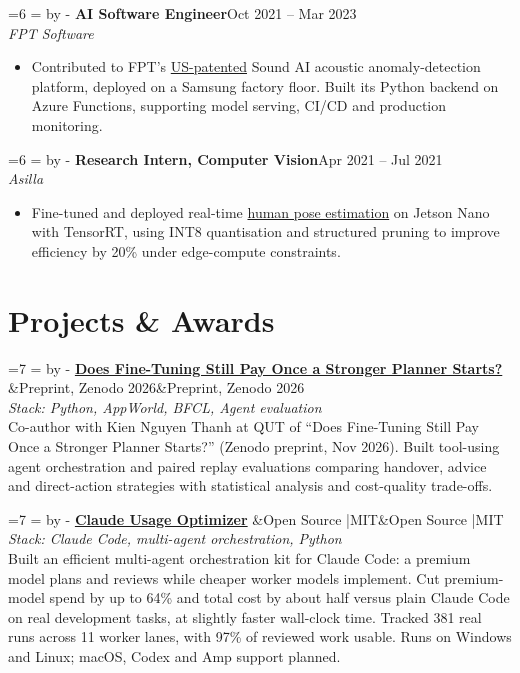 \documentclass[11pt, a4paper]{article}
\newcommand{\needroom}[1]{%
  \par\begingroup
  \dimen0=#1\relax
  \dimen2=\pagegoal\relax\advance\dimen2 by -\pagetotal\relax
  \ifdim\dimen0>\dimen2\relax\newpage\fi
  \endgroup
}
\newcommand{\role}[4]{%
  \needroom{6\baselineskip}%
  \noindent\textbf{#1}\hfill\textcolor{muted}{#2}\\
  \textit{#3}\hfill\textcolor{muted}{#4}\vspace{3pt}%
}
\newcommand{\project}[3]{%
  \needroom{7\baselineskip}%
  \noindent\textbf{#1}%
  \ifx&#2&\else\hfill\textcolor{muted}{\small #2}\fi\\[-2pt]
  \textcolor{muted}{\small\textit{Stack: #3}}\vspace{3pt}%
}
\begin{document}
\vspace{4pt}

\role{AI Software Engineer}{Oct 2021 -- Mar 2023}
{FPT Software}{}
\begin{itemize}
\item Contributed to FPT's \href{https://fptsoftware.com/newsroom/news-and-press-releases/news/fpt-achieves-us-patent-for-advanced-acoustic-anomaly-detection-technology}{US-patented} Sound AI acoustic anomaly-detection platform, deployed on a Samsung factory floor. Built its Python backend on Azure Functions, supporting model serving, CI/CD and production monitoring.
\end{itemize}

\vspace{4pt}

\role{Research Intern, Computer Vision}{Apr 2021 -- Jul 2021}
{Asilla}{}
\begin{itemize}
\item Fine-tuned and deployed real-time \href{https://github.com/hieunguyen7337/trt_pose_edited}{human pose estimation} on Jetson Nano with TensorRT, using INT8 quantisation and structured pruning to improve efficiency by 20\% under edge-compute constraints.
\end{itemize}

\section{Projects \& Awards}

\project{\href{https://doi.org/10.5281/zenodo.23882361}{Does Fine-Tuning Still Pay Once a Stronger Planner Starts?}}{Preprint, Zenodo 2026}
{Python, AppWorld, BFCL, Agent evaluation}\\
Co-author with Kien Nguyen Thanh at QUT of ``Does Fine-Tuning Still Pay Once a Stronger Planner Starts?'' (Zenodo preprint, Nov 2026). Built tool-using agent orchestration and paired replay evaluations comparing handover, advice and direct-action strategies with statistical analysis and cost-quality trade-offs.
\vspace{4pt}

\project{\href{https://github.com/hieunguyen7337/claude-usage-optimizer-releases}{Claude Usage Optimizer}}{Open Source \enspace|\enspace MIT}
{Claude Code, multi-agent orchestration, Python}\\
Built an efficient multi-agent orchestration kit for Claude Code: a premium model plans and reviews while cheaper worker models implement. Cut premium-model spend by up to 64\% and total cost by about half versus plain Claude Code on real development tasks, at slightly faster wall-clock time. Tracked 381 real runs across 11 worker lanes, with 97\% of reviewed work usable. Runs on Windows and Linux; macOS, Codex and Amp support planned.
\end{document}
